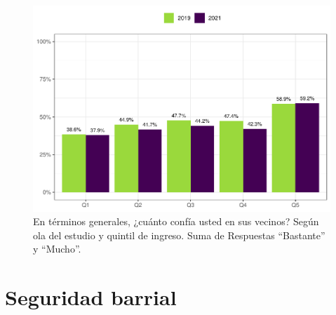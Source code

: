 \documentclass[
  12pt,
]{book}
\begin{document}
\begin{figure}

{\centering \includegraphics{reporte-elsoc_files/figure-latex/vecinos-quintil-1} 

}

\caption{En términos generales, ¿cuánto confía usted en sus vecinos? Según ola del estudio y quintil de ingreso. Suma de Respuestas “Bastante” y “Mucho”.}\label{fig:vecinos-quintil}
\end{figure}

\hypertarget{seguridad-barrial}{%
\section{Seguridad barrial}\label{seguridad-barrial}}
\end{document}
